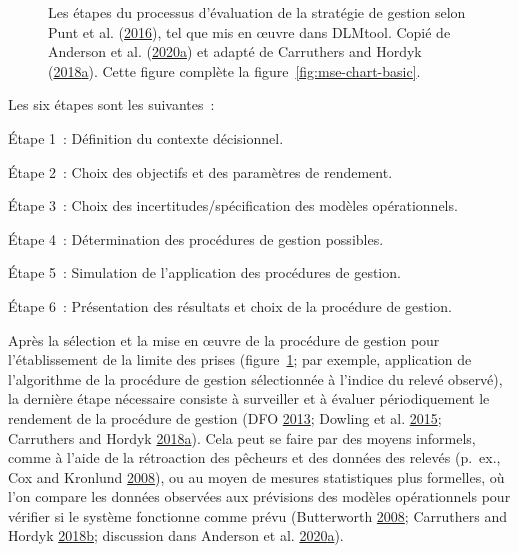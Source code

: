 \documentclass[11pt]{book}
\begin{document}
\begin{figure}[htb]

{\centering {} 

}

\caption{Les étapes du processus d'évaluation de la stratégie de gestion selon Punt et al. (\protect\hyperlink{ref-punt2016}{2016}), tel que mis en œuvre dans DLMtool. Copié de Anderson et al. (\protect\hyperlink{ref-anderson2020gfmp}{2020}\protect\hyperlink{ref-anderson2020gfmp}{a}) et adapté de Carruthers and Hordyk (\protect\hyperlink{ref-carruthers2018}{2018}\protect\hyperlink{ref-carruthers2018}{a}). Cette figure complète la figure~\ref{fig:mse-chart-basic}.}\label{fig:mse-chart}
\end{figure}
Les six étapes sont les suivantes~:

Étape 1~: Définition du contexte décisionnel.

Étape 2~: Choix des objectifs et des paramètres de rendement.

Étape 3~: Choix des incertitudes/spécification des modèles opérationnels.

Étape 4~: Détermination des procédures de gestion possibles.

Étape 5~: Simulation de l'application des procédures de gestion.

Étape 6~: Présentation des résultats et choix de la procédure de gestion.

Après la sélection et la mise en œuvre de la procédure de gestion pour l'établissement de la limite des prises (figure~\ref{fig:mse-chart}; par exemple, application de l'algorithme de la procédure de gestion sélectionnée à l'indice du relevé observé), la dernière étape nécessaire consiste à surveiller et à évaluer périodiquement le rendement de la procédure de gestion (DFO \protect\hyperlink{ref-dfo2013}{2013}; Dowling et al. \protect\hyperlink{ref-dowling2015a}{2015}; Carruthers and Hordyk \protect\hyperlink{ref-carruthers2018}{2018}\protect\hyperlink{ref-carruthers2018}{a}). Cela peut se faire par des moyens informels, comme à l'aide de la rétroaction des pêcheurs et des données des relevés (p.~ex., Cox and Kronlund \protect\hyperlink{ref-cox2008a}{2008}), ou au moyen de mesures statistiques plus formelles, où l'on compare les données observées aux prévisions des modèles opérationnels pour vérifier si le système fonctionne comme prévu (Butterworth \protect\hyperlink{ref-butterworth2008}{2008}; Carruthers and Hordyk \protect\hyperlink{ref-carruthers_hordyk_2018}{2018}\protect\hyperlink{ref-carruthers_hordyk_2018}{b}; discussion dans Anderson et al. \protect\hyperlink{ref-anderson2020gfmp}{2020}\protect\hyperlink{ref-anderson2020gfmp}{a}).
\end{document}
